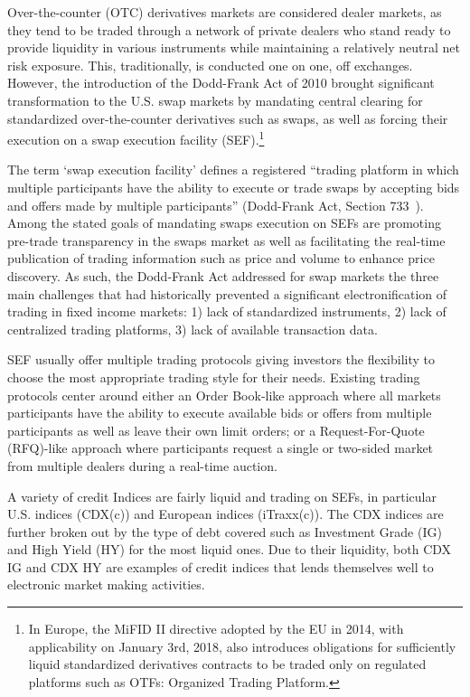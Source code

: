 \begin{enumerate}
Over-the-counter (OTC) derivatives markets are considered dealer markets, as they tend to be traded through a network of private dealers who stand ready to provide liquidity in various instruments while maintaining a relatively neutral net risk exposure. This, traditionally, is conducted one on one, off exchanges. However, the introduction of the Dodd-Frank Act of 2010 brought significant transformation to the U.S. swap markets by mandating central clearing for standardized over-the-counter derivatives such as swaps, as well as forcing their execution on a swap execution facility (SEF).\footnote{In Europe, the MiFID II directive adopted by the EU in 2014, with applicability on January 3rd, 2018, also introduces obligations for sufficiently liquid standardized derivatives contracts to be traded only on regulated platforms such as OTFs: Organized Trading Platform.}


The term `swap execution facility' defines a registered ``trading platform in which multiple participants have the ability to execute or trade swaps by accepting bids and offers made by multiple participants'' (Dodd-Frank Act, Section 733~\cite{DoddFrank}). Among the stated goals of mandating swaps execution on SEFs are promoting pre-trade transparency in the swaps market as well as facilitating the real-time publication of trading information such as price and volume to enhance price discovery. As such, the Dodd-Frank Act addressed for swap markets the three main challenges that had historically prevented a significant electronification of trading in fixed income markets: 1) lack of standardized instruments, 2) lack of centralized trading platforms, 3) lack of available transaction data.


SEF usually offer multiple trading protocols giving investors the flexibility to choose the most appropriate trading style for their needs. Existing trading protocols center around either an Order Book-like approach where all markets participants have the ability to execute available bids or offers from multiple participants as well as leave their own limit orders; or a Request-For-Quote (RFQ)-like approach where participants request a single or two-sided market from multiple dealers during a real-time auction.


A variety of credit Indices are fairly liquid and trading on SEFs, in particular U.S. indices (CDX(c)) and European indices (iTraxx(c)). The CDX indices are further broken out by the type of debt covered such as Investment Grade (IG) and High Yield (HY) for the most liquid ones. Due to their liquidity, both CDX IG and CDX HY are examples of credit indices that lends themselves well to electronic market making activities.



\end{enumerate}

